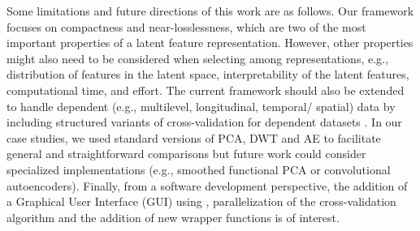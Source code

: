 Some limitations and future directions of this work are as follows.
Our framework focuses on compactness and near-losslessness, which are two of the most important properties of a latent feature representation.
However, other properties might also need to be considered when selecting among representations, e.g., distribution of features in the latent space, interpretability of the latent features, computational time, and effort.
The current framework should also be extended to handle dependent (e.g., multilevel, longitudinal, temporal/ spatial) data by including structured variants of cross-validation for dependent datasets
\parencite{bergmeir_note_2018, hornung_evaluating_2023, roberts_cross-validation_2017}.
In our case studies, we used standard versions of PCA, DWT and AE to facilitate general and straightforward comparisons but future work could consider specialized implementations (e.g., smoothed functional PCA or convolutional autoencoders). 
Finally, from a software development perspective, the addition of a Graphical User Interface (GUI) using  \parencite{chang_shiny_2021}, parallelization of the cross-validation algorithm and the addition of new wrapper functions is of interest.


